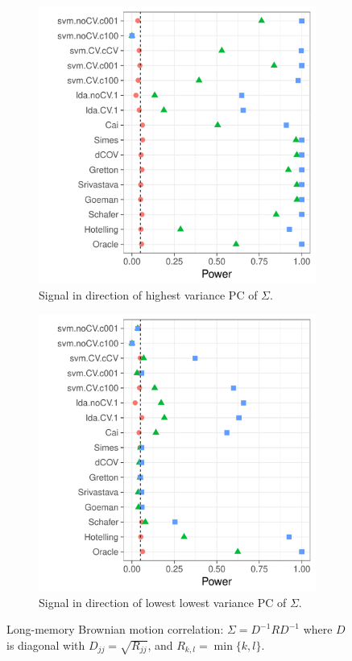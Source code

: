 \documentclass[oupdraft]{bio}
\begin{document}
\begin{figure}[h]
	\centering
	\begin{subfigure}[t]{.45\columnwidth}
		\centering
		\includegraphics[width=1\columnwidth]{"file22"}
		\caption{Signal in direction of highest variance PC of $\Sigma$.} 
		\label{fig:dependence_21}
	\end{subfigure}
	\begin{subfigure}[t]{.45\columnwidth}
		\centering
		\includegraphics[width=1\columnwidth]{"file23"}
		\caption{Signal in direction of lowest lowest variance PC of $\Sigma$.} 
		\label{fig:dependence_22}
	\end{subfigure}
	\caption{Long-memory Brownian motion correlation: $\Sigma=D^{-1} R D^{-1}$ where $D$ is diagonal with $D_{jj}=\sqrt{R_{jj}}$, and $R_{k,l}=\min\{k,l\}$.}	
	\label{fig:dependence_2}
\end{figure}
\end{document}
